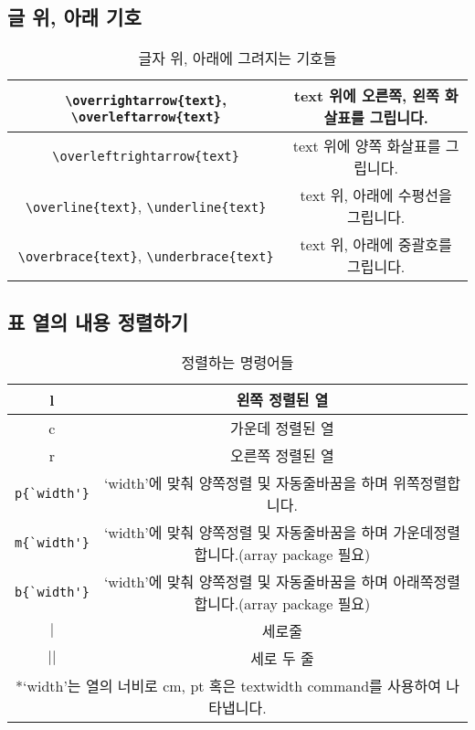 \subsection{글 위, 아래 기호}
\begin{table}[hp]
	\centering
	\begin{tabular}{|c|c|}
		\hline
		\verb|\overrightarrow{text}|, \verb|\overleftarrow{text}| & text 위에 오른쪽, 왼쪽 화살표를 그립니다.\\
		\hline
		\verb|\overleftrightarrow{text}| & text 위에 양쪽 화살표를 그립니다.\\
		\hline
		\verb|\overline{text}|, \verb|\underline{text}| & text 위, 아래에 수평선을 그립니다.\\
		\hline
		\verb|\overbrace{text}|, \verb|\underbrace{text}| & text 위, 아래에 중괄호를 그립니다.\\
		\hline
	\end{tabular}
	\caption{글자 위, 아래에 그려지는 기호들}
	\label{tab:overunder}
\end{table}

\subsection{표 열의 내용 정렬하기}
\begin{table}[hp]
	\centering
	\begin{tabular}{|c|c|}
		\hline
		l & 왼쪽 정렬된 열\\
		\hline
		c & 가운데 정렬된 열\\
		\hline
		r & 오른쪽 정렬된 열\\
		\hline
		\verb|p{`width'}| & `width'에 맞춰 양쪽정렬 및 자동줄바꿈을 하며 위쪽정렬합니다.\\
		\hline
		\verb|m{`width'}| & `width'에 맞춰 양쪽정렬 및 자동줄바꿈을 하며 가운데정렬합니다.(array package 필요)\\
		\hline
		\verb|b{`width'}| & `width'에 맞춰 양쪽정렬 및 자동줄바꿈을 하며 아래쪽정렬합니다.(array package 필요)\\
		\hline
		$\mid$ & 세로줄\\
		\hline
		$\mid$$\mid$ & 세로 두 줄\\
		\hline
		\multicolumn{2}{c}{*`width'는 열의 너비로 cm, pt 혹은 textwidth command를 사용하여 나타냅니다.}
	\end{tabular}
	\caption{정렬하는 명령어들}
	\label{tab:pos}
\end{table}

